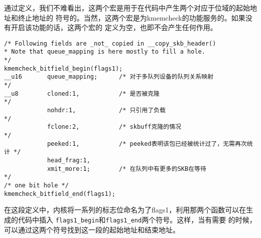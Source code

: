 通过定义，我们不难看出，这两个宏是用于在代码中产生两个对应于位域的起始地址和终止地址的
符号的。当然，这两个宏是为kmemcheck的功能服务的。如果没有开启该功能的话，这两个宏的
定义为空，也即不会产生任何作用。
\begin{verbatim}
/* Following fields are _not_ copied in __copy_skb_header()
* Note that queue_mapping is here mostly to fill a hole.
*/
kmemcheck_bitfield_begin(flags1);
__u16       queue_mapping;      /* 对于多队列设备的队列关系映射                 */
__u8        cloned:1,           /* 是否被克隆                               */
            nohdr:1,            /* 只引用了负载                                 */
            fclone:2,           /* skbuff克隆的情况                             */
            peeked:1,           /* peeked表明该包已经被统计过了，无需再次统计 */
            head_frag:1,
            xmit_more:1;        /* 在队列中有更多的SKB在等待                    */
/* one bit hole */
kmemcheck_bitfield_end(flags1);
\end{verbatim}

在这段定义中，内核将一系列的标志位命名为了flags1，利用那两个函数可以在生成的代码中插入
\texttt{flags1_begin}和\texttt{flags1_end}两个符号。这样，当有需要
的时候，可以通过这两个符号找到这一段的起始地址和结束地址。

